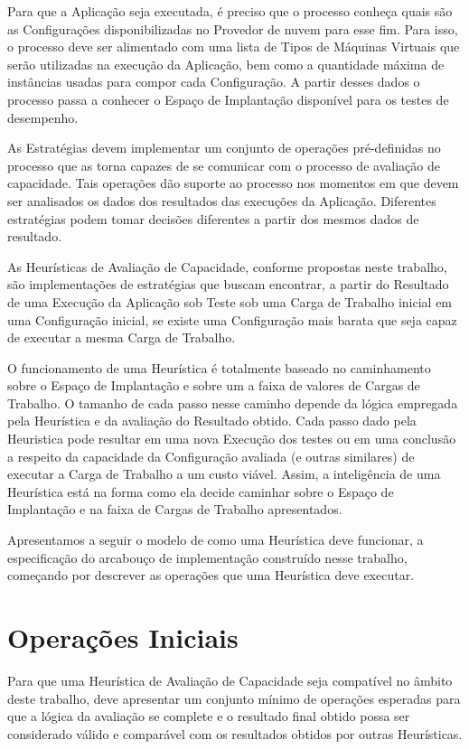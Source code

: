 Para que a Aplicação seja executada, é preciso que o processo conheça quais são
as Configurações disponibilizadas no Provedor de nuvem para esse fim. Para isso,
o processo deve ser alimentado com uma lista de Tipos de Máquinas Virtuais que
serão utilizadas na execução da Aplicação, bem como a quantidade máxima de 
instâncias usadas para compor cada Configuração. A partir desses dados o processo
passa a conhecer o Espaço de Implantação disponível para os testes de desempenho.

  
As Estratégias devem implementar um conjunto de operações pré-definidas no processo 
que as torna capazes de se comunicar com o processo de avaliação de capacidade. Tais 
operações dão suporte ao processo nos momentos em que devem ser analisados os dados
dos resultados das execuções da Aplicação. Diferentes estratégias podem tomar 
decisões diferentes a partir dos mesmos dados de resultado.

As Heurísticas de Avaliação de Capacidade, conforme propostas neste trabalho, 
são implementações de estratégias que buscam encontrar, a partir do Resultado 
de uma Execução da Aplicação sob Teste sob uma Carga de Trabalho inicial em uma 
Configuração inicial, se existe uma Configuração mais barata que seja capaz de 
executar a mesma Carga de Trabalho.

O funcionamento de uma Heurística é totalmente baseado no caminhamento sobre o
Espaço de Implantação e sobre um a faixa de valores de Cargas de Trabalho. O 
tamanho de cada passo nesse caminho depende da lógica empregada pela Heurística 
e da avaliação do Resultado obtido. Cada passo dado pela Heuristica pode resultar 
em uma nova Execução dos testes ou em uma conclusão a respeito da capacidade da 
Configuração avaliada (e outras similares) de executar a Carga de Trabalho a um 
custo viável. Assim, a inteligência de uma Heurística está na forma como ela 
decide caminhar sobre o Espaço de Implantação e na faixa de Cargas de
Trabalho apresentados.

Apresentamos a seguir o modelo de como uma Heurística deve funcionar, a 
especificação do arcabouço de implementação construído nesse trabalho, começando
por descrever as operações que uma Heurística deve executar. 

\section{Operações Iniciais}
Para que uma Heurística de Avaliação de Capacidade seja compatível no âmbito deste trabalho, 
deve apresentar um conjunto mínimo de operações esperadas para que a lógica da
avaliação se complete e o resultado final obtido possa ser considerado válido e
comparável com os resultados obtidos por outras Heurísticas.

